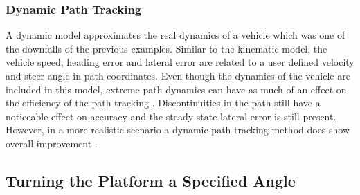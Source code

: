 \documentclass[main.tex]{subfiles}
\begin{document}
\subsubsection{Dynamic Path Tracking}
A dynamic model approximates the real dynamics of a vehicle which was one of the downfalls of the previous examples. Similar to the kinematic model, the vehicle speed, heading error and lateral error are related to a user defined velocity and steer angle in path coordinates. Even though the dynamics of the vehicle are included in this model, extreme path dynamics can have as much of an effect on the efficiency of the path tracking \parencite{snider2009}. Discontinuities in the path still have a noticeable effect on accuracy and the steady state lateral error is still present. However, in a more realistic scenario a dynamic path tracking method does show overall improvement \parencite{snider2009}.

\subsection{Turning the Platform a Specified Angle}
\end{document}
